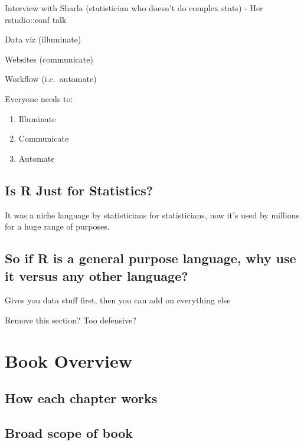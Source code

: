 \documentclass[
]{book}
\providecommand{\tightlist}{%
  \setlength{\itemsep}{0pt}\setlength{\parskip}{0pt}}
\begin{document}
Interview with Sharla (statistician who doesn't do complex stats)
- Her rstudio::conf talk

Data viz (illuminate)

Websites (communicate)

Workflow (i.e.~automate)

Everyone needs to:

\begin{enumerate}
\def\labelenumi{\arabic{enumi}.}
\tightlist
\item
  Illuminate
\item
  Communicate
\item
  Automate
\end{enumerate}

\hypertarget{is-r-just-for-statistics}{%
\subsection{Is R Just for Statistics?}\label{is-r-just-for-statistics}}

It was a niche language by statisticians for statisticians, now it's used by millions for a huge range of purposes.

\hypertarget{so-if-r-is-a-general-purpose-language-why-use-it-versus-any-other-language}{%
\subsection{So if R is a general purpose language, why use it versus any other language?}\label{so-if-r-is-a-general-purpose-language-why-use-it-versus-any-other-language}}

Gives you data stuff first, then you can add on everything else

Remove this section? Too defensive?

\hypertarget{book-overview}{%
\section{Book Overview}\label{book-overview}}

\hypertarget{how-each-chapter-works}{%
\subsection{How each chapter works}\label{how-each-chapter-works}}

\hypertarget{broad-scope-of-book}{%
\subsection{Broad scope of book}\label{broad-scope-of-book}}
\end{document}
